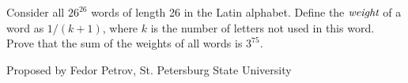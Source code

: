 Consider all $26^{26}$ words of length 26 in the Latin
alphabet. Define the $\emph{weight}$ of a word as $1/(k+1)$, where $k$
is the number of letters not used in this word. Prove that the sum
of the weights of all words is $3^{75}$.

Proposed by Fedor Petrov, St. Petersburg State University